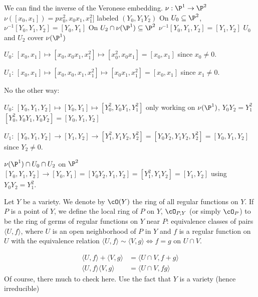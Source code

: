\begin{ex}
We can find the inverse of the Veronese embedding. $\nu: \P^1 \to \P^2$
$\nu([x_0,x_1])= px_0^2,x_0x_1,x_1^2]$ labeled $(Y_0,Y_1Y_2)$
On $U_0 \subseteq \P^2$, 
$\nu^{-1}[Y_0,Y_1,Y_2]= [Y_0,Y_1]$
On $U_2 \cap \nu(\P^1) \subseteq \P^2$
$\nu^{-1}[Y_0,Y_1,Y_2]= [Y_1,Y_2]$
$U_0$ and $U_2$ cover $\nu(\P^1)$

$U_0$: $[x_0,x_1] \mapsto [x_0,x_0x_1,x_1^2] \mapsto [x_0^2,x_0x_1]= [x_0,x_1]$ since $x_0 \neq 0$. 

$U_1$: $[x_0,x_1] \mapsto [x_0,x_0,x_1,x_1^2] \mapsto [x_0x_1,x_1^2]= [x_0,x_1]$ since $x_1 \neq 0$. 


No the other way:

$U_0$: $[Y_0,Y_1,Y_2] \mapsto [Y_0,Y_1] \mapsto [Y_0^2,Y_0Y_1,Y_1^2]$ only working on $\nu(\P^1)$, $Y_0Y_2= Y_1^2$
$[Y_0^2,Y_0Y_1,Y_0Y_2]= [Y_0,Y_1,Y_2]$

$U_1$: $[Y_0,Y_1,Y_2] \to [Y_1,Y_2] \to [Y_1^2,Y_1Y_2,Y_2^2]= [Y_0Y_2,Y_1Y_2,Y_2^2]= [Y_0,Y_1,Y_2]$ since $Y_2 \neq 0$. 

$\nu(\P^1) \cap U_0 \cap U_2$ on $\P^2$
$[Y_0,Y_1,Y_2] \to [Y_0,Y_1]= [Y_0Y_2,Y_1,Y_2]= [Y_1^2,Y_1Y_2] = [Y_1,Y_2]$ using $Y_0Y_2=Y_1^2$. 
\end{ex}


\begin{dfn}
Let $Y$ be a variety. We denote by $\cO(Y)$ the ring of all regular functions on $Y$. If $P$ is a point of $Y$, we define the local ring of $P$ on $Y$, $\cO_{P,Y}$ (or simply $\cO_P$) to be the ring of germs of regular functions on $Y$ near $P$: equivalence classes of pairs $\langle U,f \rangle$, where $U$ is an open neighborhood of $P$ in $Y$ and $f$ is a regular function on $U$ with the equivalence relation $\langle U,f \rangle \sim \langle V,g \rangle \Leftrightarrow f=g \text{ on } U \cap V$.
\end{dfn}

	\[
	\begin{split}
	\langle U,f \rangle + \langle V,g \rangle&= \langle U \cap V, f+g \rangle \\
	\langle U,f \rangle \langle V,g \rangle&= \langle U \cap V, fg \rangle 
	\end{split}
	\]
Of course, there much to check here. Use the fact that $Y$ is a variety (hence irreducible)






















